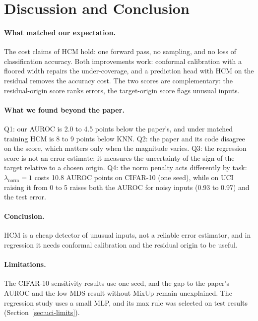\documentclass[letterpaper]{article} %
\begin{document}


\section{Discussion and Conclusion}
\label{sec:conclusion}

\paragraph{What matched our expectation.} The cost claims of HCM hold: one forward pass, no sampling, and no loss of classification accuracy. Both improvements work: conformal calibration with a floored width repairs the under-coverage, and a prediction head with HCM on the residual removes the accuracy cost. The two scores are complementary: the residual-origin score ranks errors, the target-origin score flags unusual inputs.

\paragraph{What we found beyond the paper.} Q1: our AUROC is 2.0 to 4.5 points below the paper's, and under matched training HCM is 8 to 9 points below KNN. Q2: the paper and its code disagree on the score, which matters only when the magnitude varies. Q3: the regression score is not an error estimate; it measures the uncertainty of the sign of the target relative to a chosen origin. Q4: the norm penalty acts differently by task: $\lambda_{\text{norm}}=1$ costs 10.8 AUROC points on CIFAR-10 (one seed), while on UCI raising it from 0 to 5 raises both the AUROC for noisy inputs (0.93 to 0.97) and the test error.

\paragraph{Conclusion.} HCM is a cheap detector of unusual inputs, not a reliable error estimator, and in regression it needs conformal calibration and the residual origin to be useful.

\paragraph{Limitations.} The CIFAR-10 sensitivity results use one seed, and the gap to the paper's AUROC and the low MDS result without MixUp remain unexplained. The regression study uses a small MLP, and its max rule was selected on test results (Section~\ref{sec:uci-limits}).


\end{document}
